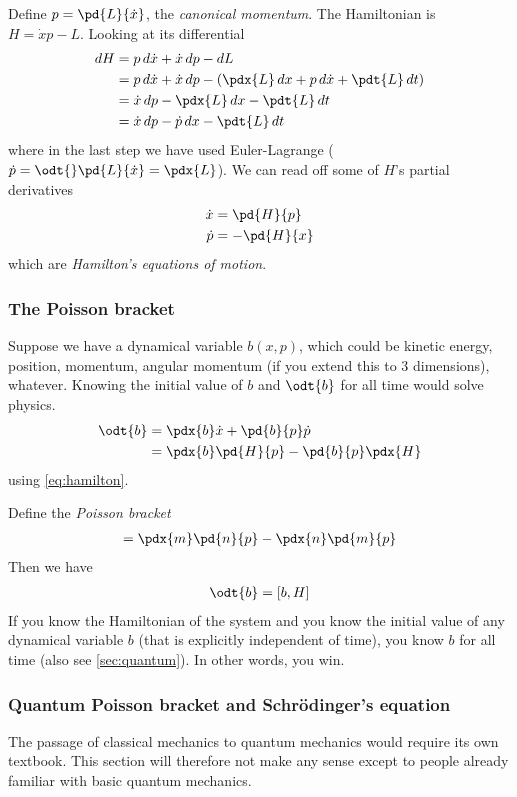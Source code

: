 \documentclass[12pt, oneside, letterpaper, fleqn]{article}
\begin{document}
Define $p = \pd{L}{\dot{x}}$, the \emph{canonical momentum}. The
Hamiltonian is $H = \dot{x}p - L$. Looking at its differential
\begin{align*}
dH &= p\,d\dot{x} + \dot{x}\,dp - dL\\
&= p\,d\dot{x} + \dot{x}\,dp - \left(\pdx{L}\,dx + p\,d\dot{x} +
\pdt{L}\,dt\right)\\
&= \dot{x}\,dp - \pdx{L}\,dx - \pdt{L}\,dt\\
&= \dot{x}\,dp - \dot{p}\,dx - \pdt{L}\,dt
\end{align*}
where in the last step we have used Euler-Lagrange ($\dot{p} =
\odt{}\pd{L}{\dot{x}} = \pdx{L}$). We can read off some of $H$'s partial
derivatives
\begin{align}\begin{split}\label{eq:hamilton}
\dot{x} &= \pd{H}{p}\\
\dot{p} &= -\pd{H}{x}
\end{split}\end{align}
which are \emph{Hamilton's equations of motion}.

\subsubsection{The Poisson bracket}
Suppose we have a dynamical variable $b(x,p)$, which could be kinetic
energy, position, momentum, angular momentum (if you extend this to 3
dimensions), whatever. Knowing the initial value of $b$ and $\odt{b}$
for all time would solve physics.
\begin{align*}
\odt{b} &= \pdx{b}\dot{x} + \pd{b}{p}\dot{p}\\
&= \pdx{b}\pd{H}{p} - \pd{b}{p}\pdx{H}
\end{align*}
using \autoref{eq:hamilton}.

Define the \emph{Poisson bracket}
\begin{align}
[m, n] = \pdx{m}\pd{n}{p} - \pdx{n}\pd{m}{p}
\end{align}
Then we have
\begin{align}\label{eq:classical_eom}
\odt{b} = [b, H]
\end{align}
If you know the Hamiltonian of the system and you know the initial value
of any dynamical variable $b$ (that is explicitly independent of time),
you know $b$ for all time (also see \autoref{sec:quantum}). In other
words, you win.

\subsubsection{Quantum Poisson bracket and Schr\"odinger's
equation}\label{sec:quantum}
The passage of classical mechanics to quantum mechanics would require
its own textbook. This section will therefore not make any sense except
to people already familiar with basic quantum mechanics.
\end{document}
